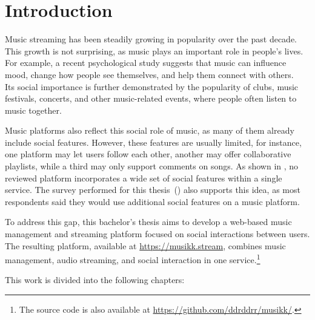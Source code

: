 \chapter{Introduction}\label{ch:intro}

Music streaming has been steadily growing in popularity over the past
decade.~\parencite{music_stats_decade} This growth is not surprising, as music
plays an important role in people's lives.
For example, a recent psychological study suggests that music can influence mood,
change how people see themselves, and help them connect with others.~\parencite{music_role_life}
Its social importance is further demonstrated by the popularity of clubs, music
festivals, concerts, and other music-related events, where people often listen
to music together.~\parencite{concert_going_social_aspects}

Music platforms also reflect this social role of music, as many of them already include social features.
However, these features are usually limited, for instance, one platform may let users follow
each other, another may offer collaborative playlists, while a third may only
support comments on songs.
As shown in , no reviewed platform incorporates a wide
set of social features within a single service.
The survey performed for this thesis~() also supports this
idea, as most respondents said they would use additional social features on a
music platform.

To address this gap, this bachelor's thesis aims to develop a web-based
music management and streaming platform focused on social interactions
between users. The resulting platform, available at \url{https://musikk.stream},
combines music management, audio streaming, and social interaction in one
service.\footnote{The source code is also available at \url{https://github.com/ddrddrr/musikk/}.}

This work is divided into the following chapters:

